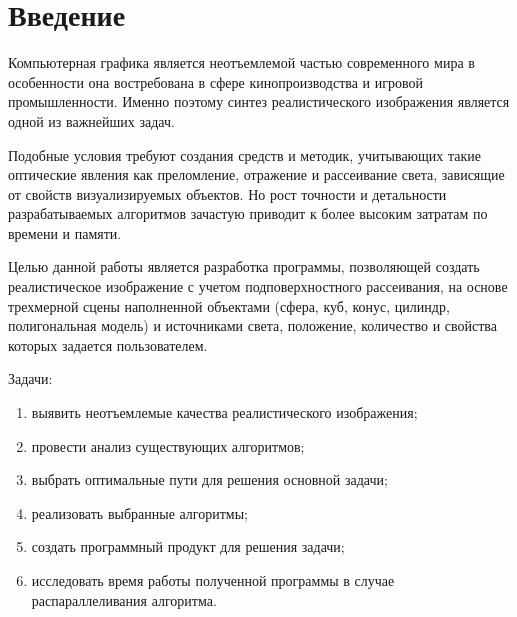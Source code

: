 \section*{Введение}

Компьютерная графика является неотъемлемой частью современного мира в
особенности она востребована в сфере кинопроизводства и игровой
промышленности. Именно поэтому синтез реалистического изображения является
одной из важнейших задач.

Подобные условия требуют создания средств и методик, учитывающих такие
оптические явления как преломление, отражение и рассеивание света, зависящие от
свойств визуализируемых объектов. Но рост точности и детальности
разрабатываемых алгоритмов зачастую приводит к более высоким затратам по
времени и памяти.

Целью данной работы является разработка программы, позволяющей создать
реалистическое изображение с учетом подповерхностного рассеивания, на основе
трехмерной сцены наполненной объектами (сфера, куб, конус, цилиндр,
полигональная модель) и источниками света, положение, количество и свойства
которых задается пользователем.

Задачи:
\begin{enumerate}
    \item выявить неотъемлемые качества реалистического изображения;
    \item провести анализ существующих алгоритмов;
    \item выбрать оптимальные пути для решения основной задачи;
    \item реализовать выбранные алгоритмы;
    \item создать программный продукт для решения задачи;
    \item исследовать время работы полученной программы в случае
          распараллеливания алгоритма.
\end{enumerate}

\pagebreak


